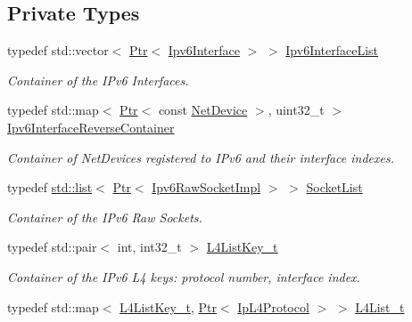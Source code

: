 \subsection*{Private Types}
\begin{DoxyCompactItemize}
\item 
typedef std\+::vector$<$ \hyperlink{classns3_1_1Ptr}{Ptr}$<$ \hyperlink{classns3_1_1Ipv6Interface}{Ipv6\+Interface} $>$ $>$ \hyperlink{classns3_1_1Ipv6L3Protocol_a3324185c048c5bcd0a4511b8ebf166db}{Ipv6\+Interface\+List}
\begin{DoxyCompactList}\small\item\em Container of the I\+Pv6 Interfaces. \end{DoxyCompactList}\item 
typedef std\+::map$<$ \hyperlink{classns3_1_1Ptr}{Ptr}$<$ const \hyperlink{classns3_1_1NetDevice}{Net\+Device} $>$, uint32\+\_\+t $>$ \hyperlink{classns3_1_1Ipv6L3Protocol_a1fb40e4ad1a4612f73c192418df88228}{Ipv6\+Interface\+Reverse\+Container}
\begin{DoxyCompactList}\small\item\em Container of Net\+Devices registered to I\+Pv6 and their interface indexes. \end{DoxyCompactList}\item 
typedef \hyperlink{openflow-interface_8h_afd9bcfa176617760671b67580f536fa7}{std\+::list}$<$ \hyperlink{classns3_1_1Ptr}{Ptr}$<$ \hyperlink{classns3_1_1Ipv6RawSocketImpl}{Ipv6\+Raw\+Socket\+Impl} $>$ $>$ \hyperlink{classns3_1_1Ipv6L3Protocol_ab5dd63c7563ecb5ac6a2b019ad7fa484}{Socket\+List}
\begin{DoxyCompactList}\small\item\em Container of the I\+Pv6 Raw Sockets. \end{DoxyCompactList}\item 
typedef std\+::pair$<$ int, int32\+\_\+t $>$ \hyperlink{classns3_1_1Ipv6L3Protocol_ade8066a20a3494dbda177322b1d18c21}{L4\+List\+Key\+\_\+t}
\begin{DoxyCompactList}\small\item\em Container of the I\+Pv6 L4 keys\+: protocol number, interface index. \end{DoxyCompactList}\item 
typedef std\+::map$<$ \hyperlink{classns3_1_1Ipv6L3Protocol_ade8066a20a3494dbda177322b1d18c21}{L4\+List\+Key\+\_\+t}, \hyperlink{classns3_1_1Ptr}{Ptr}$<$ \hyperlink{classns3_1_1IpL4Protocol}{Ip\+L4\+Protocol} $>$ $>$ \hyperlink{classns3_1_1Ipv6L3Protocol_a081eeffb80d91d0702285b6bb5687082}{L4\+List\+\_\+t}

\end{DoxyCompactItemize}
